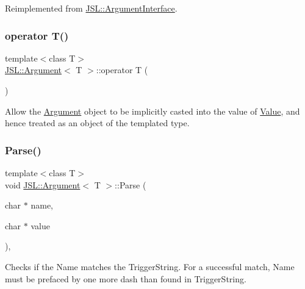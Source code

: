 Reimplemented from \hyperlink{classJSL_1_1ArgumentInterface_a256b5bd88b5f6638353f108c48f3ee65}{J\+S\+L\+::\+Argument\+Interface}.

\mbox{\label{classJSL_1_1Argument_a965bc0dfdce6e03380605af313f8c880}} 
\subsubsection{\texorpdfstring{operator T()}{operator T()}}
{\footnotesize\ttfamily template$<$class T$>$ \\
\hyperlink{classJSL_1_1Argument}{J\+S\+L\+::\+Argument}$<$ T $>$\+::operator T (\begin{DoxyParamCaption}{ }\end{DoxyParamCaption})\hspace{0.3cm}{\ttfamily [inline]}}



Allow the \hyperlink{classJSL_1_1Argument}{Argument} object to be implicitly casted into the value of \hyperlink{classJSL_1_1Argument_a83ada5bfa412192f76dd4290f679defd}{Value}, and hence treated as an object of the templated type. 

\mbox{\label{classJSL_1_1Argument_a8984e7ce23155259d90a3e98170f36e0}} 
\subsubsection{\texorpdfstring{Parse()}{Parse()}}
{\footnotesize\ttfamily template$<$class T$>$ \\
void \hyperlink{classJSL_1_1Argument}{J\+S\+L\+::\+Argument}$<$ T $>$\+::Parse (\begin{DoxyParamCaption}\item[{char $\ast$}]{name,  }\item[{char $\ast$}]{value }\end{DoxyParamCaption})\hspace{0.3cm}{\ttfamily [inline]}, {\ttfamily [virtual]}}



Checks if the Name matches the Trigger\+String. For a successful match, Name must be prefaced by one more dash than found in Trigger\+String. 


